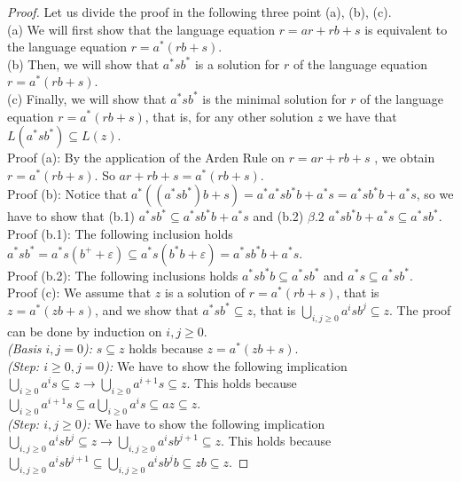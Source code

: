 \documentclass[prodmode,acmtecs]{acmsmall}
\begin{document}
\begin{proof}
	Let us divide the proof in the following three point (a), (b), (c).
	\\
	(a) We will first show that the language equation $r=ar+rb+s$ is
	equivalent to the language equation $r=a^{*}(rb+s)$. \\
	(b) Then, we will show that $a^{*}sb^{*}$ is a solution for $r$
	of the language equation $r=a^{*}(rb+s)$. \\
	(c) Finally, we will show that $a^{*}sb^{*}$ is the minimal solution
	for $r$ of the language equation $r=a^{*}(rb+s)$, that is, for
	any other solution $z$ we have that $L(a^{*}sb^{*})\subseteq L(z)$.\\

	Proof (a): By the application of the Arden Rule on $r=ar+rb+s$ ,
	we obtain $r=a^{*}(rb+s)$. So $ar+rb+s=a^{*}(rb+s)$\cite{Pettorossi13}.\\

	Proof (b): Notice that $a^{*}((a^{*}sb^{*})b+s)=a^{*}a^{*}sb^{*}b+a^{*}s=a^{*}sb^{*}b+a^{*}s$,
	so we have to show that (b.1) $a^{*}sb^{*}\subseteq a^{*}sb^{*}b+a^{*}s$
	and (b.2) $\beta.2$ $a^{*}sb^{*}b+a^{*}s\subseteq a^{*}sb^{*}$.\\

	Proof (b.1): The following inclusion holds $a^{*}sb^{*}=a^{*}s(b^{+}+\varepsilon)\subseteq a^{*}s(b^{*}b+\varepsilon)=a^{*}sb^{*}b+a^{*}s$.\\

	Proof (b.2): The following inclusions holds $a^{*}sb^{*}b\subseteq a^{*}sb^{*}$
	and $a^{*}s\subseteq a^{*}sb^{*}$.\\

	Proof (c): We assume that $z$ is a solution of $r=a^{*}(rb+s)$,
	that is $z=a^{*}(zb+s)$, and we show that $a^{*}sb^{*}\subseteq z$,
	that is $\bigcup_{i,j\geq0}a^{i}sb^{j}\subseteq z$. The proof can
	be done by induction on $i,j\geq0$.\\
	\textsl{(Basis $i,j=0$):} $s\subseteq z$ holds because
	$z=a^{*}(zb+s)$.\\
	\textsl{(Step: $i\geq0,j=0$):} We have to show the following implication
	$\bigcup_{i\geq0}a^{i}s\subseteq z\rightarrow\bigcup_{i\geq0}a^{i+1}s\subseteq z$.
	This holds because $\bigcup_{i\geq0}a^{i+1}s\subseteq a\bigcup_{i\geq0}a^{i}s\subseteq az\subseteq z$.
	\\
	\textsl{(Step: $i,j\geq0$):} We have to show the following implication
	$\bigcup_{i,j\geq0}a^{i}sb^{j}\subseteq z\rightarrow\bigcup_{i,j\geq0}a^{i}sb^{j+1}\subseteq z$.
	This holds because $\bigcup_{i,j\geq0}a^{i}sb^{j+1}\subseteq\bigcup_{i,j\geq0}a^{i}sb^{j}b\subseteq zb\subseteq z$.
\end{proof}
\end{document}
